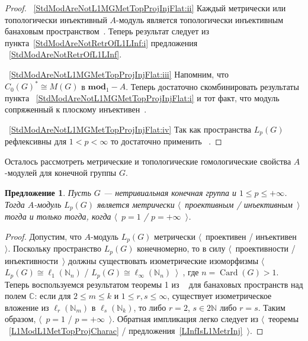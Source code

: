 \documentclass{article}
\numberwithin{equation}{section}
\theoremstyle{plain}
\newtheorem{propos}{Предложение}
\theoremstyle{definition}
\newtheorem{proof}{Доказательство}\def\theproof{}
\newcommand{\isom}{\mathop{\mathbin{\cong}}}
\begin{document}
\begin{fulltext}
\begin{proof}
~\ref{StdModAreNotL1MGMetTopProjInjFlat:ii} Каждый метрически или топологически
инъективный $A$-модуль является топологически инъективным банаховым
пространством~\cite[предложение~3.8]{NemGeomProjInjFlatBanMod}. Теперь результат
следует из пункта~\ref{StdModAreNotRetrOfL1LInf:i} предложения
~\ref{StdModAreNotRetrOfL1LInf}.

~\ref{StdModAreNotL1MGMetTopProjInjFlat:iii} Напомним, что ${C_0(G)}^*\isom
M(G)$ в $\mathbf{mod}_1-A$. Теперь достаточно скомбинировать результаты пункта
~\ref{StdModAreNotL1MGMetTopProjInjFlat:i} и тот факт, что модуль сопряженный к
плоскому инъективен~\cite[предложение~2.21]{NemGeomProjInjFlatBanMod}.

~\ref{StdModAreNotL1MGMetTopProjInjFlat:iv} Так как пространства $L_p(G)$
рефлексивны для $1<p<\infty$ то достаточно применить
~\cite[следствие~3.14]{NemGeomProjInjFlatBanMod}.
\end{proof}

Осталось рассмотреть метрические и топологические гомологические свойства
$A$-модулей для конечной группы $G$.

\begin{propos}\label{LpFinGrL1MGMetrInjProjCharac} Пусть $G$ --- нетривиальная
конечная группа и $1\leq p\leq +\infty$. Тогда $A$-модуль $L_p(G)$ является
метрически $\langle$~проективным / инъективным~$\rangle$ тогда и только тогда,
когда $\langle$~$p=1$ / $p=+\infty$~$\rangle$.
\end{propos}
\begin{proof} 
Допустим, что $A$-модуль $L_p(G)$ метрически $\langle$~проективен /
инъективен~$\rangle$. Поскольку пространство $L_p(G)$ конечномерно, то в силу
$\langle$~проективности / инъективности~$\rangle$ должны существовать
изометрические изоморфизмы $\langle$~$L_p(G)\isom \ell_1(\mathbb{N}_n)$ /
$L_p(G)\isom \ell_\infty(\mathbb{N}_n)$~$\rangle$~\cite[предложение~3.8,
пункты~\textup{(i)}, \textup{(ii)}]{NemGeomProjInjFlatBanMod}, где
$n=\operatorname{Card}(G)>1$. Теперь воспользуемся результатом теоремы 1 из
~\cite{LyubIsomEmdbFinDimLp} для банаховых пространств над полем $\mathbb{C}$:
если для $2\leq m\leq k$ и $1\leq r,s\leq \infty$, существует изометрическое
вложение из $\ell_r(\mathbb{N}_m)$ в $\ell_s(\mathbb{N}_k)$, то либо $r=2$,
$s\in 2\mathbb{N}$ либо $r=s$. Таким образом, $\langle$~$p=1$ /
$p=+\infty$~$\rangle$. Обратная импликация легко следует из $\langle$~теоремы
~\ref{L1ModL1MetTopProjCharac} / предложения~\ref{LInfIsL1MetrInj}~$\rangle$.
\end{proof}


\end{fulltext}
\end{document}

